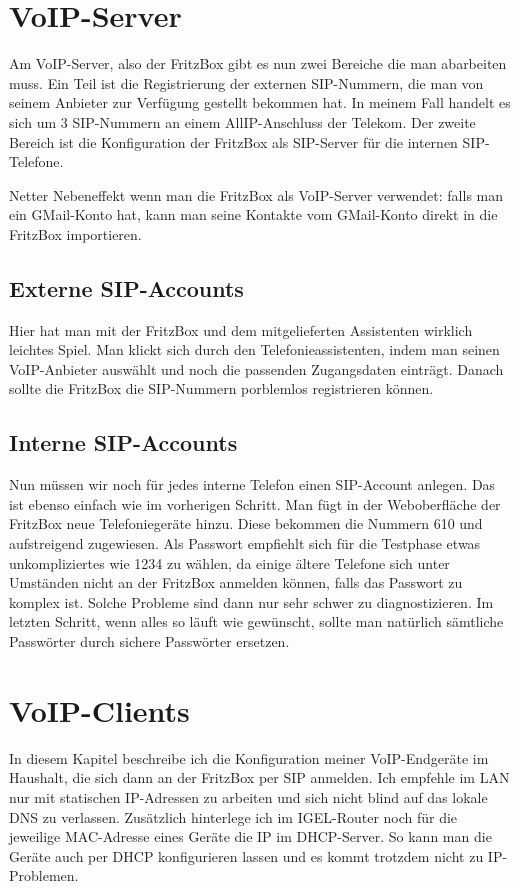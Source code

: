 \documentclass[a4paper,12pt]{scrbook}
\begin{document}
\section{VoIP-Server}
Am VoIP-Server, also der FritzBox gibt es nun zwei Bereiche die man abarbeiten muss. Ein Teil ist die Registrierung der externen SIP-Nummern,
die man von seinem Anbieter zur Verfügung gestellt bekommen hat. In meinem Fall handelt es sich um 3 SIP-Nummern an einem AllIP-Anschluss der Telekom.
Der zweite Bereich ist die Konfiguration der FritzBox als SIP-Server für die internen SIP-Telefone.

Netter Nebeneffekt wenn man die FritzBox als VoIP-Server verwendet: falls man ein GMail-Konto hat, kann man seine Kontakte vom GMail-Konto direkt in die FritzBox importieren.
\subsection{Externe SIP-Accounts}
Hier hat man mit der FritzBox und dem mitgelieferten Assistenten wirklich leichtes Spiel. Man klickt sich durch den Telefonieassistenten, indem man seinen 
VoIP-Anbieter auswählt und noch die passenden Zugangsdaten einträgt. Danach sollte die FritzBox die SIP-Nummern porblemlos registrieren können. 

\subsection{Interne SIP-Accounts}
Nun müssen wir noch für jedes interne Telefon einen SIP-Account anlegen. Das ist ebenso einfach wie im vorherigen Schritt. Man fügt in der Weboberfläche 
der FritzBox neue Telefoniegeräte hinzu. Diese bekommen die Nummern 610 und aufstreigend zugewiesen. Als Passwort empfiehlt sich für die Testphase etwas 
unkompliziertes wie 1234 zu wählen, da einige ältere Telefone sich unter Umständen nicht an der FritzBox anmelden können, falls das Passwort zu komplex ist.
Solche Probleme sind dann nur sehr schwer zu diagnostizieren. Im letzten Schritt, wenn alles so läuft wie gewünscht, sollte man natürlich sämtliche Passwörter
durch sichere Passwörter ersetzen.


\section{VoIP-Clients}
In diesem Kapitel beschreibe ich die Konfiguration meiner VoIP-Endgeräte im Haushalt, die sich dann an der FritzBox per SIP anmelden. Ich empfehle im LAN nur mit statischen
IP-Adressen zu arbeiten und sich nicht blind auf das lokale DNS zu verlassen. Zusätzlich hinterlege ich im IGEL-Router noch für die jeweilige MAC-Adresse eines Geräte die 
IP im DHCP-Server. So kann man die Geräte auch per DHCP konfigurieren lassen und es kommt trotzdem nicht zu IP-Problemen.
\end{document}
